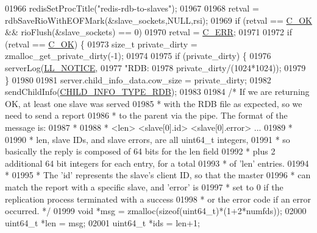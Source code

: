 \begin{DoxyCode}
{{{{{{{{{{{{{{{{{{{{{{{{{{{{{{{{{{{{{{01966         redisSetProcTitle(\textcolor{stringliteral}{"redis-rdb-to-slaves"});
01967 
01968         retval = rdbSaveRioWithEOFMark(&slave\_sockets,NULL,rsi);
01969         \textcolor{keywordflow}{if} (retval == \hyperlink{server_8h_a303769ef1065076e68731584e758d3e1}{C\_OK} && rioFlush(&slave\_sockets) == 0)
01970             retval = \hyperlink{server_8h_af98ac28d5f4d23d7ed5985188e6fb7d1}{C\_ERR};
01971 
01972         \textcolor{keywordflow}{if} (retval == \hyperlink{server_8h_a303769ef1065076e68731584e758d3e1}{C\_OK}) \{
01973             size\_t private\_dirty = zmalloc\_get\_private\_dirty(-1);
01974 
01975             \textcolor{keywordflow}{if} (private\_dirty) \{
01976                 serverLog(\hyperlink{server_8h_a8c54c191e436c7dd3012167212692401}{LL\_NOTICE},
01977                     \textcolor{stringliteral}{"RDB: %
01978                     private\_dirty/(1024*1024));
01979             \}
01980 
01981             server.child\_info\_data.cow\_size = private\_dirty;
01982             sendChildInfo(\hyperlink{server_8h_a878f18d9e3d0af58b81a17d764a81dbe}{CHILD\_INFO\_TYPE\_RDB});
01983 
01984             \textcolor{comment}{/* If we are returning OK, at least one slave was served}
01985 \textcolor{comment}{             * with the RDB file as expected, so we need to send a report}
01986 \textcolor{comment}{             * to the parent via the pipe. The format of the message is:}
01987 \textcolor{comment}{             *}
01988 \textcolor{comment}{             * <len> <slave[0].id> <slave[0].error> ...}
01989 \textcolor{comment}{             *}
01990 \textcolor{comment}{             * len, slave IDs, and slave errors, are all uint64\_t integers,}
01991 \textcolor{comment}{             * so basically the reply is composed of 64 bits for the len field}
01992 \textcolor{comment}{             * plus 2 additional 64 bit integers for each entry, for a total}
01993 \textcolor{comment}{             * of 'len' entries.}
01994 \textcolor{comment}{             *}
01995 \textcolor{comment}{             * The 'id' represents the slave's client ID, so that the master}
01996 \textcolor{comment}{             * can match the report with a specific slave, and 'error' is}
01997 \textcolor{comment}{             * set to 0 if the replication process terminated with a success}
01998 \textcolor{comment}{             * or the error code if an error occurred. */}
01999             \textcolor{keywordtype}{void} *msg = zmalloc(\textcolor{keyword}{sizeof}(uint64\_t)*(1+2*numfds));
02000             uint64\_t *len = msg;
02001             uint64\_t *ids = len+1;
}}}}}}}}}}}}}}}}}}}}}}}}}}}}}}}}}}}}}}}
\end{DoxyCode}

